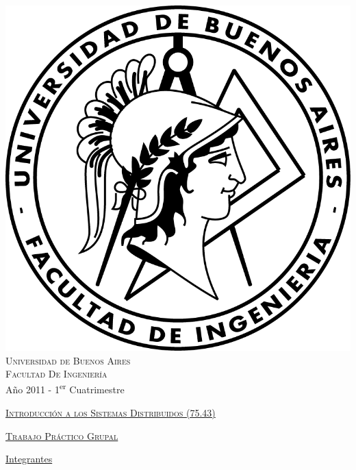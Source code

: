 \documentclass[12pt,titlepage]{article}
\begin{document}
\begin{titlepage}

\thispagestyle{empty}

\begin{center}
\includegraphics[scale=0.55]{Logo-fiuba.png}\\
\large{\textsc{Universidad de Buenos Aires}}\\
\large{\textsc{Facultad De Ingeniería}}\\
\small{Año 2011 - 1\textsuperscript{er} Cuatrimestre}
\end{center}

\vfill

\begin{center}

\Large{\underline{\textsc{Introducción a los Sistemas Distribuidos (75.43)}}}

\vfill


\Large{\underline{\textsc{Trabajo Práctico Grupal}}}

\vfill

\Large\underline{Integrantes} \linebreak\linebreak


\end{center}
\end{titlepage}
\end{document}
